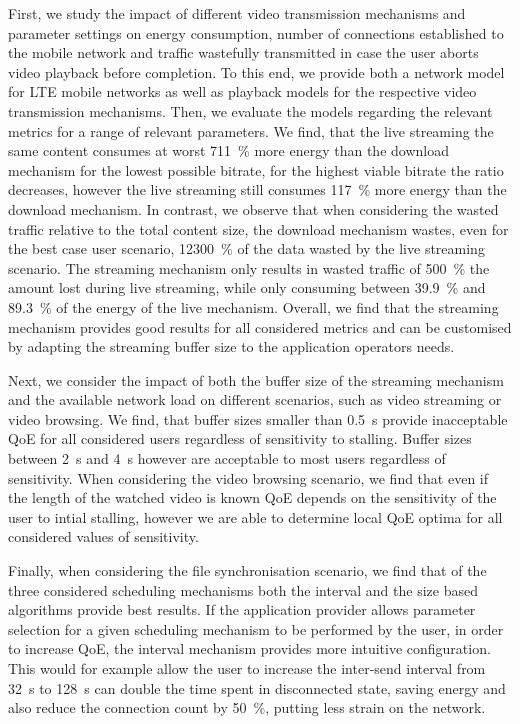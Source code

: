 First, we study the impact of different video transmission mechanisms and parameter settings on energy consumption, number of connections established to the mobile network and traffic wastefully transmitted in case the user aborts video playback before completion.
To this end, we provide both a network model for \gls{LTE} mobile networks as well as playback models for the respective video transmission mechanisms.
Then, we evaluate the models regarding the relevant metrics for a range of relevant parameters.
We find, that the live streaming the same content consumes at worst \SI{711}{\percent} more energy than the download mechanism for the lowest possible bitrate, for the highest viable bitrate the ratio decreases, however the live streaming still consumes \SI{117}{\percent} more energy than the download mechanism.
In contrast, we observe that when considering the wasted traffic relative to the total content size, the download mechanism wastes, even for the best case user scenario, \SI{12300}{\percent} of the data wasted by the live streaming scenario.
The streaming mechanism only results in wasted traffic of \SI{500}{\percent} the amount lost during live streaming, while only consuming between \SI{39.9}{\percent} and \SI{89.3}{\percent} of the energy of the live mechanism.	
Overall, we find that the streaming mechanism provides good results for all considered metrics and can be customised by adapting the streaming buffer size to the application operators needs. 

Next, we consider the impact of both the buffer size of the streaming mechanism and the available network load on different scenarios, such as video streaming or video browsing.
We find, that buffer sizes smaller than \SI{0.5}{\second} provide inacceptable \gls{QoE} for all considered users regardless of sensitivity to stalling.
Buffer sizes between \SI{2}{\second} and \SI{4}{\second} however are acceptable to most users regardless of sensitivity.
When considering the video browsing scenario, we find that even if the length of the watched video is known \gls{QoE} depends on the sensitivity of the user to intial stalling, however we are able to determine local \gls{QoE} optima for all considered values of sensitivity.

Finally, when considering the file synchronisation scenario, we find that of the three considered scheduling mechanisms both the interval and the size based algorithms provide best results.
If the application provider allows parameter selection for a given scheduling mechanism to be performed by the user, in order to increase \gls{QoE}, the interval mechanism provides more intuitive configuration.
This would for example allow the user to increase the inter-send interval from \SI{32}{\second} to \SI{128}{\second} can double the time spent in disconnected state, saving energy and also reduce the connection count by \SI{50}{\percent}, putting less strain on the network.

